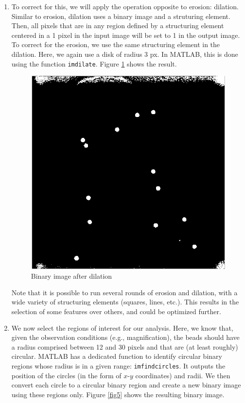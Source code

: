 \documentclass[a4paper]{article}
\begin{document}
\begin{enumerate}
    \item To correct for this, we will apply the operation opposite to erosion: dilation. Similar to erosion, dilation uses a binary image and a struturing element. Then, all pixels that are in any region defined by a structuring element centered in a 1 pixel in the input image will be set to 1 in the output image. To correct for the erosion, we use the same structuring element in the dilation. Here, we again use a disk of radius 3 px. In MATLAB, this is done using the function \verb|imdilate|. Figure \ref{fig4} shows the result.
    
    \begin{figure}[H]
        \center
        \label{fig4}
        \includegraphics[scale=0.75]{bin.png}
        \caption{Binary image after dilation}
    \end{figure}

    Note that it is possible to run several rounds of erosion and dilation, with a wide variety of structuring elements (squares, lines, etc.). This results in the selection of some features over others, and could be optimized further.

    \item We now select the regions of interest for our analysis. Here, we know that, given the observation conditions (e.g., magnification), the beads should have a radius comprised between 12 and 30 pixels and that are (at least roughly) circular. MATLAB has a dedicated function to identify circular binary regions whose radius is in a given range: \verb|imfindcircles|. It outputs the position of the circles (in the form of $x$-$y$ coordinates) and radii. We then convert each circle to a circular binary region and create a new binary image using these regions only. Figure \ref{fig5} shows the resulting binary image.
    

\end{enumerate}
\end{document}
